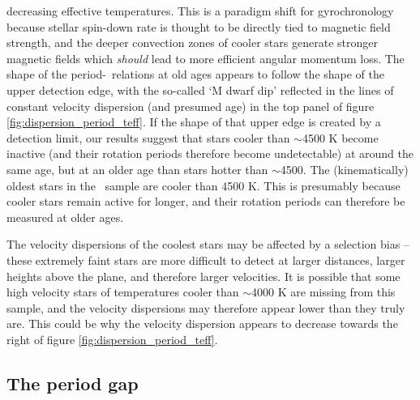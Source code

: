 decreasing effective temperatures.
This is a paradigm shift for gyrochronology because stellar spin-down rate is
thought to be directly tied to magnetic field strength, and the deeper
convection zones of cooler stars generate stronger magnetic fields which {\it
should} lead to more efficient angular momentum loss.
The shape of the period-\teff\ relations at old ages appears to follow the
shape of the upper detection edge, with the so-called `M dwarf dip'
\citep{vansaders2018} reflected in the lines of constant velocity dispersion
(and presumed age) in the top panel of figure
\ref{fig:dispersion_period_teff}.
If the shape of that upper edge is created by a detection limit, our results
suggest that stars cooler than $\sim$4500 K become inactive (and their
rotation periods therefore become undetectable) at around the same age, but at
an older age than stars hotter than $\sim$4500.
The (kinematically) oldest stars in the \mct\ sample are cooler than 4500 K.
This is presumably because cooler stars remain active for longer, and their
rotation periods can therefore be measured at older ages.

The velocity dispersions of the coolest stars may be affected by a selection
bias -- these extremely faint stars are more difficult to detect at larger
distances, larger heights above the plane, and therefore larger velocities.
It is possible that some high velocity stars of temperatures cooler than
$\sim$4000 K are missing from this sample, and the velocity dispersions may
therefore appear lower than they truly are.
This could be why the velocity dispersion appears to decrease towards the
right of figure \ref{fig:dispersion_period_teff}.

\subsection{The period gap}
\label{sec:period_gap}

